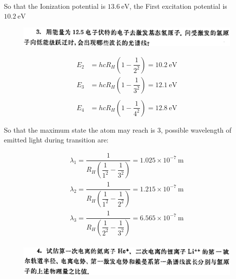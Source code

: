 \documentclass{article}
\begin{document}
So that the Ionization potential is $13.6 \  \mathrm{eV}$, the First excitation potential is $10.2 \  \mathrm{eV}$

\begin{figure}[H]
  \centering
  \includegraphics[width=\linewidth]{figures/Problem3}
  \label{fig:}
\end{figure}

\begin{equation*}
  \begin{aligned}
    E_2 &= hc R_H \left( 1 - \dfrac{1}{2^2} \right) = 10.2 \  \mathrm{eV} \\
    E_3 &= hc R_H \left( 1 - \dfrac{1}{3^2} \right) = 12.1 \  \mathrm{eV} \\
  \end{aligned}
\end{equation*}
\begin{equation*}
  \begin{aligned}
    E_4 &= hc R_H \left( 1 - \dfrac{1}{4^2} \right) = 12.8 \  \mathrm{eV}
  \end{aligned}
\end{equation*}

So that the maximum state the atom may reach is $3$, possible wavelength of emitted light during transition are:

\begin{equation*}
  \begin{aligned}
    \lambda_1 = \dfrac{1}{R_H \left( \dfrac{1}{1^2} - \dfrac{1}{3^2} \right)} = 1.025 \times 10^{-7} \  \mathrm{m} \\
    \lambda_2 = \dfrac{1}{R_H \left( \dfrac{1}{1^2} - \dfrac{1}{2^2} \right)} = 1.215 \times 10^{-7} \  \mathrm{m} \\
    \lambda_3 = \dfrac{1}{R_H \left( \dfrac{1}{2^2} - \dfrac{1}{3^2} \right)} = 6.565 \times 10^{-7} \  \mathrm{m} \\
  \end{aligned}
\end{equation*}

\begin{figure}[H]
  \centering
  \includegraphics[width=\linewidth]{figures/Problem4}
  \label{fig:}
\end{figure}
\end{document}
